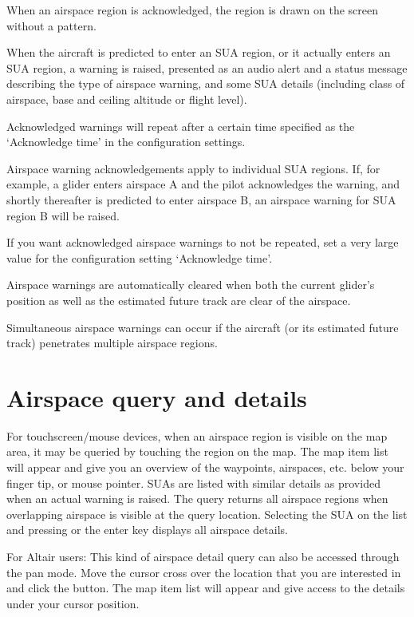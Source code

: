 When an airspace region is acknowledged, the region is drawn on the
screen without a pattern.

When the aircraft is predicted to enter an SUA region, or it actually
enters an SUA region, a warning is raised, presented as an audio alert
and a status message describing the type of airspace warning, and some SUA
details (including class of airspace, base and ceiling altitude or
flight level).

Acknowledged warnings will repeat after a certain time specified as
the `Acknowledge time' in the configuration settings.

Airspace warning acknowledgements apply to individual SUA regions.
If, for example, a glider enters airspace A and the pilot acknowledges
the warning, and shortly thereafter is predicted to enter airspace B,
an airspace warning for SUA region B will be raised.

\tip If you want acknowledged airspace warnings to not be repeated,
set a very large value for the configuration setting `Acknowledge
time'.

Airspace warnings are automatically cleared when both the current
glider's position as well as the estimated future track are clear
of the airspace.

Simultaneous airspace warnings can occur if the aircraft (or its
estimated future track) penetrates multiple airspace regions.

\section{Airspace query and details}

For touchscreen/mouse devices, when an airspace region is visible on
the map area, it may be queried by touching the region on the map.  
The map item list will appear and give you an overview of the waypoints, 
airspaces, etc. below your finger tip, or mouse pointer.  SUAs are listed with 
similar details as provided when an actual warning is raised.  
The query returns all airspace regions when overlapping airspace is visible at 
the query location.
Selecting the SUA on the list and pressing  or the enter key 
displays all airspace details. 

\tip For Altair users: This kind of airspace detail query can also be accessed through 
the pan mode.  Move the cursor cross over the location that you are interested 
in and click the  button.  The map item list will appear 
and give access to the details under your cursor position.

